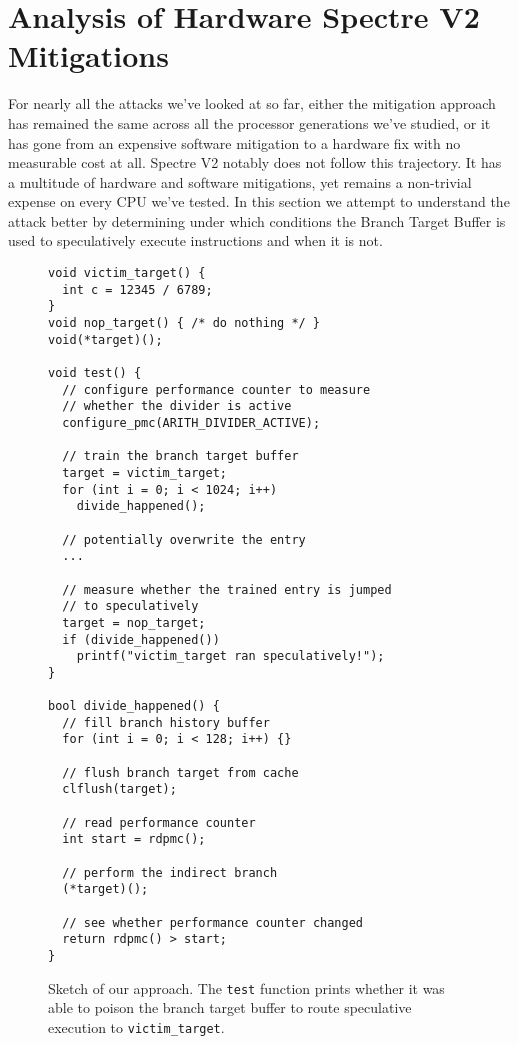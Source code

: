 \section{Analysis of Hardware Spectre V2 Mitigations}
\label{s:analysis}

For nearly all the attacks we've looked at so far, either the mitigation approach has remained the same across all the processor generations we've studied, or it has gone from an expensive software mitigation to a hardware fix with no measurable cost at all.
Spectre V2 notably does not follow this trajectory.
It has a multitude of hardware and software mitigations, yet remains a non-trivial expense on every CPU we've tested.
In this section we attempt to understand the attack better by determining under which conditions the
Branch Target Buffer is used to speculatively execute instructions and when it is not.

\begin{figure}[!ht]
\begin{lstlisting}
void victim_target() {
  int c = 12345 / 6789;
}
void nop_target() { /* do nothing */ }
void(*target)();

void test() {
  // configure performance counter to measure
  // whether the divider is active
  configure_pmc(ARITH_DIVIDER_ACTIVE);

  // train the branch target buffer
  target = victim_target;
  for (int i = 0; i < 1024; i++)
    divide_happened();

  // potentially overwrite the entry
  ...

  // measure whether the trained entry is jumped
  // to speculatively
  target = nop_target;
  if (divide_happened())
    printf("victim_target ran speculatively!");
}

bool divide_happened() {
  // fill branch history buffer
  for (int i = 0; i < 128; i++) {}

  // flush branch target from cache
  clflush(target);

  // read performance counter
  int start = rdpmc();

  // perform the indirect branch
  (*target)();

  // see whether performance counter changed
  return rdpmc() > start;
}\end{lstlisting}
\caption{Sketch of our approach. The \texttt{test} function prints whether it was able to poison the branch target buffer to route speculative execution to \texttt{victim\_target}.}
\label{fig:spectre2-sample}
\end{figure}
\vfill
\clearpage

